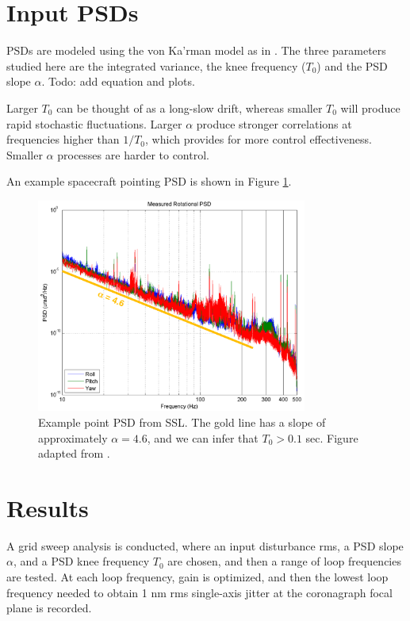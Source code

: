 \documentclass[10pt,preprint]{aastex631}
\begin{document}
\section{Input PSDs}

PSDs are modeled using the von Ka'rman model as in \citet{2019AJ....157...36D}.  The three parameters studied here are the integrated variance, the knee frequency ($T_0$) and the PSD slope $\alpha$.  Todo: add equation and plots.

Larger $T_0$ can be thought of as a long-slow drift, whereas smaller $T_0$ will produce rapid stochastic fluctuations.  Larger $\alpha$ produce stronger correlations at frequencies higher than $1/T_0$, which provides for more control effectiveness.  Smaller $\alpha$ processes are harder to control.

An example spacecraft pointing PSD is shown in Figure \ref{fig:examp_psd}. 

\begin{figure}
\centering
\includegraphics[width=3.5in]{ssl_example.png}
\caption{Example point PSD from SSL.  The gold line has a slope of approximately $\alpha=4.6$, and we can infer that $T_0 > 0.1$ sec.  Figure adapted from \citet{woo:2017}. \label{fig:examp_psd}}
\end{figure}

\section{Results}

A grid sweep analysis is conducted, where an input disturbance rms, a PSD slope $\alpha$, and a PSD knee frequency $T_0$ are chosen, and then a range of loop frequencies are tested.  At each loop frequency, gain is optimized, and then the lowest loop frequency needed to obtain 1 nm rms single-axis jitter at the coronagraph focal plane is recorded.  
\end{document}
